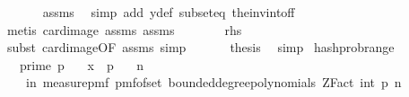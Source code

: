 \begin{isabellebody}
\ \ \ \ \ \isamarkupfalse%
\ assms\ \isamarkupfalse%
\ {\isacharparenleft}{\kern0pt}simp\ add{\isacharcolon}{\kern0pt}\ y{\isacharprime}{\kern0pt}{\isacharunderscore}{\kern0pt}def\ subset{\isacharunderscore}{\kern0pt}eq\ the{\isacharunderscore}{\kern0pt}inv{\isacharunderscore}{\kern0pt}into{\isacharunderscore}{\kern0pt}f{\isacharunderscore}{\kern0pt}f{\isacharparenright}{\kern0pt}\isanewline
\ \ \ \ \ \isamarkupfalse%
\ {\isacharparenleft}{\kern0pt}metis\ card{\isacharunderscore}{\kern0pt}image\ assms{\isacharparenleft}{\kern0pt}{}{\isacharparenright}{\kern0pt}\ assms{\isacharparenleft}{\kern0pt}{}{\isacharparenright}{\kern0pt}{\isacharparenright}{\kern0pt}\isanewline
\ \ \isamarkupfalse%
\ \isamarkupfalse%
\ {\isachardoublequoteopen}{\isachardot}{\kern0pt}{\isachardot}{\kern0pt}{\isachardot}{\kern0pt}\ {\isacharequal}{\kern0pt}\ {\isacharquery}{\kern0pt}rhs{\isachardoublequoteclose}\isanewline
\ \ \ \ \ \isamarkupfalse%
\ {\isacharparenleft}{\kern0pt}subst\ card{\isacharunderscore}{\kern0pt}image{\isacharbrackleft}{\kern0pt}OF\ assms{\isacharparenleft}{\kern0pt}{}{\isacharparenright}{\kern0pt}{\isacharbrackright}{\kern0pt}{\isacharcomma}{\kern0pt}\ simp{\isacharparenright}{\kern0pt}\isanewline
\ \ \ \isamarkupfalse%
\ \isamarkupfalse%
\ {\isacharquery}{\kern0pt}thesis\ \isamarkupfalse%
\ simp\isanewline
{}\isamarkupfalse%
%
\endisatagproof
{\isafoldproof}%
%
\isadelimproof
\isanewline
%
\endisadelimproof
\isanewline
{}\isamarkupfalse%
\ hash{\isacharunderscore}{\kern0pt}prob{\isacharunderscore}{\kern0pt}range{\isacharcolon}{\kern0pt}\isanewline
\ \ \ {\isachardoublequoteopen}prime\ p{\isachardoublequoteclose}\isanewline
\ \ \ {\isachardoublequoteopen}x\ {\isacharless}{\kern0pt}\ p{\isachardoublequoteclose}\isanewline
\ \ \ {\isachardoublequoteopen}n\ {\isachargreater}{\kern0pt}\ {}{\isachardoublequoteclose}\isanewline
\ \ \ {\isachardoublequoteopen}{\isasymP}{\isacharparenleft}{\kern0pt}{\isasymomega}\ in\ measure{\isacharunderscore}{\kern0pt}pmf\ {\isacharparenleft}{\kern0pt}pmf{\isacharunderscore}{\kern0pt}of{\isacharunderscore}{\kern0pt}set\ {\isacharparenleft}{\kern0pt}bounded{\isacharunderscore}{\kern0pt}degree{\isacharunderscore}{\kern0pt}polynomials\ {\isacharparenleft}{\kern0pt}ZFact\ {\isacharparenleft}{\kern0pt}int\ p{\isacharparenright}{\kern0pt}{\isacharparenright}{\kern0pt}\ n{\isacharparenright}{\kern0pt}{\isacharparenright}{\kern0pt}{\isachardot}{\kern0pt}\isanewline

\end{isabellebody}
